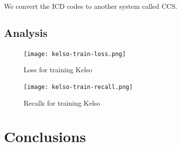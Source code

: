 \documentclass[]{marticle}
\begin{document}
We convert the ICD codes to another system called CCS. 

\subsection{Analysis}

\begin{figure}[ht] 
\center
\texttt{[image: kelso-train-loss.png]}
\caption{Loss for training Kelso} 
\end{figure}

\begin{figure}[ht] 
\center
\texttt{[image: kelso-train-recall.png]}
\caption{Recalls for training Kelso} 
\end{figure}

\section{Conclusions}



\end{document}

